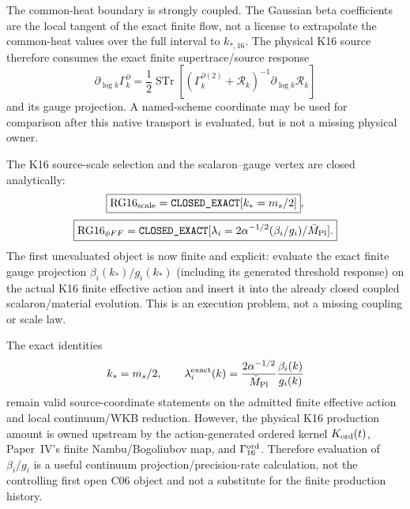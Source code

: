 \documentclass[12pt,a4paper]{article}
\begin{document}
\begin{remark}
\label{p12:rem:v2177-no-long-gaussian-extrapolation}
The common-heat boundary is strongly coupled.  The Gaussian beta coefficients
are the local tangent of the exact finite flow, not a license to extrapolate
the common-heat values over the full interval to $k_{*,16}$.  The physical K16
source therefore consumes the exact finite supertrace/source response
\[
 \partial_{\log k}\Gamma_k^\partial
 =\frac12\operatorname{STr}
 [ (\Gamma_k^{\partial(2)}+\mathcal R_k)^{-1}
   \partial_{\log k}\mathcal R_k]
\]
and its gauge projection.  A named-scheme coordinate may be used for
comparison after this native transport is evaluated, but is not a missing
physical owner.
\end{remark}

\begin{corollary}
\label{p12:cor:v2177-rg16-scale-retyped}
The K16 source-scale selection and the scalaron--gauge vertex are closed
analytically:
\[
 \boxed{\mathrm{RG16}_{\rm scale}=\texttt{CLOSED\_EXACT}[k_*=m_s/2]},
\]
\[
 \boxed{\mathrm{RG16}_{\phi FF}=\texttt{CLOSED\_EXACT}
 [\lambda_i=2\alpha^{-1/2}(\beta_i/g_i)/\bar M_{\rm Pl}].}
\]
The first unevaluated object is now finite and explicit: evaluate the exact
finite gauge projection $\beta_i(k_*)/g_i(k_*)$ (including its generated
threshold response) on the actual K16 finite effective action and insert it
into the already closed coupled scalaron/material evolution.  This is an
execution problem, not a missing coupling or scale law.
\end{corollary}


\begin{corollary}
\label{p12:cor:v2178-continuum-source-descendant}
The exact identities
\[
 k_*=m_s/2,
 \qquad
 \lambda_i^{\rm exact}(k)=
 \frac{2\alpha^{-1/2}}{\bar M_{\rm Pl}}\frac{\beta_i(k)}{g_i(k)}
\]
remain valid source-coordinate statements on the admitted finite effective
action and local continuum/WKB reduction.  However, the physical K16
production amount is owned upstream by the action-generated ordered kernel
$K_{\rm ord}(t)$, Paper~IV's finite Nambu/Bogoliubov map, and
$\Gamma_{16}^{\rm ord}$.  Therefore evaluation of $\beta_i/g_i$ is a useful
continuum projection/precision-rate calculation, not the controlling first
open C06 object and not a substitute for the finite production history.
\end{corollary}
\end{document}
